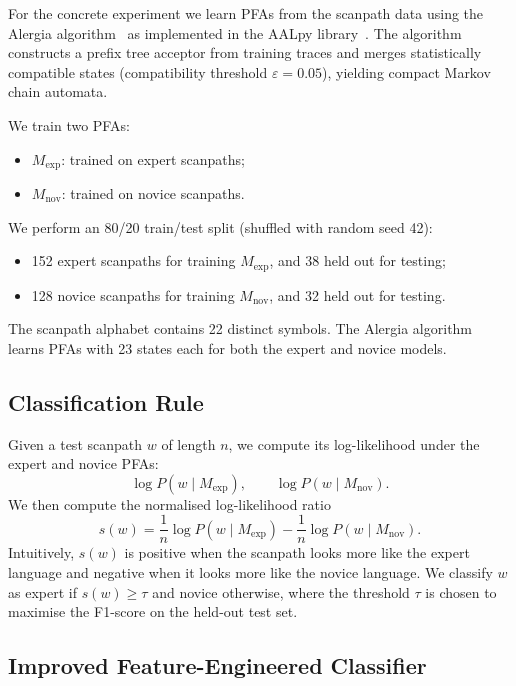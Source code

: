 \documentclass[sigconf]{acmart}
\theoremstyle{plain}
\theoremstyle{definition}
\begin{document}
For the concrete experiment we learn PFAs from the scanpath data using the Alergia algorithm~\cite{carrasco1994} as implemented in the AALpy library~\cite{muskardin2021}.
The algorithm constructs a prefix tree acceptor from training traces and merges statistically compatible states (compatibility threshold $\varepsilon = 0.05$), yielding compact Markov chain automata.

We train two PFAs:
\begin{itemize}
    \item $M_{\text{exp}}$: trained on expert scanpaths;
    \item $M_{\text{nov}}$: trained on novice scanpaths.
\end{itemize}

We perform an 80/20 train/test split (shuffled with random seed 42):
\begin{itemize}
    \item 152 expert scanpaths for training $M_{\text{exp}}$, and 38 held out for testing;
    \item 128 novice scanpaths for training $M_{\text{nov}}$, and 32 held out for testing.
\end{itemize}

The scanpath alphabet contains 22 distinct symbols.
The Alergia algorithm learns PFAs with 23 states each for both the expert and novice models.

\subsection{Classification Rule}

Given a test scanpath $w$ of length $n$, we compute its log-likelihood under the expert and novice PFAs:
\[
\log P(w \mid M_{\text{exp}}), \qquad \log P(w \mid M_{\text{nov}}).
\]
We then compute the normalised log-likelihood ratio
\[
s(w) = \frac{1}{n} \log P(w \mid M_{\text{exp}})
       - \frac{1}{n} \log P(w \mid M_{\text{nov}}).
\]
Intuitively, $s(w)$ is positive when the scanpath looks more like the expert language and negative when it looks more like the novice language.
We classify $w$ as expert if $s(w) \geq \tau$ and novice otherwise, where the threshold $\tau$ is chosen to maximise the F1-score on the held-out test set.

\subsection{Improved Feature-Engineered Classifier}
\end{document}
